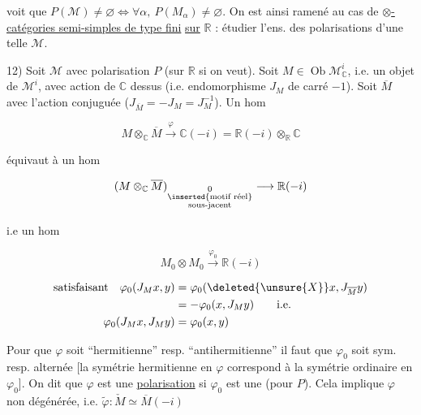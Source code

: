 
voit que $P(\mathcal M)\ne\varnothing\Longleftrightarrow\forall\alpha,\ P(M_\alpha)\ne\varnothing$. On est ainsi ramené au cas de \uline{$\otimes$-catégories semi-simples de type fini} \uline{sur} $\mathbb R$ : étudier l'ens. des polarisations d'une telle $\mathcal M$.

12) Soit $\mathcal M$ avec polarisation $P$ (sur $\mathbb R$ si on veut). Soit $M\in\operatorname{Ob}\mathcal M_{\mathbb C}^i$, i.e. un objet  de $\mathcal M^i$, avec action de $\mathbb C$ dessus (i.e. endomorphisme $J_M$ de carré $-1$). Soit $\overline M$ avec l'action conjuguée ($J_{\overline M}=-J_M=J_M^{-1}$). Un hom

\[
M\otimes_{\mathbb C}\overline M\xrightarrow{\varphi}\mathbb C(-i)=\mathbb R(-i)\otimes_{\mathbb R}\mathbb C
\]

équivaut à un hom

\[
(M\otimes_{\mathbb C}\overline M)_{\underset{\substack{\inserted{\text{motif réel}}\\\text{sous-jacent}}}{0}}\longrightarrow\mathbb R(-i)
\]

i.e un hom

\[
M_0\otimes M_0\xrightarrow{\varphi_0}\mathbb R(-i)
\]

\[
\begin{aligned}
\text{satisfaisant}\quad\varphi_0(J_Mx,y)&=\varphi_0(\deleted{\unsure{X}}x,J_{\overline M}y)\\
&=-\varphi_0(x,J_My)\qquad\text{i.e.}\\
\varphi_0(J_Mx,J_My)&=\varphi_0(x,y)
\end{aligned}
\]

Pour que $\varphi$ soit  ``hermitienne'' resp. ``antihermitienne'' il faut  que $\varphi_0$ soit sym. resp. alternée [la symétrie hermitienne en $\varphi$ correspond à la symétrie ordinaire en $\varphi_0$]. On dit que $\varphi$ est une \uline{polarisation}  si $\varphi_0$  est une (pour $P$). Cela implique $\varphi$ non dégénérée, i.e. $\widetilde\varphi:\check M\simeq\overline M(-i)$

